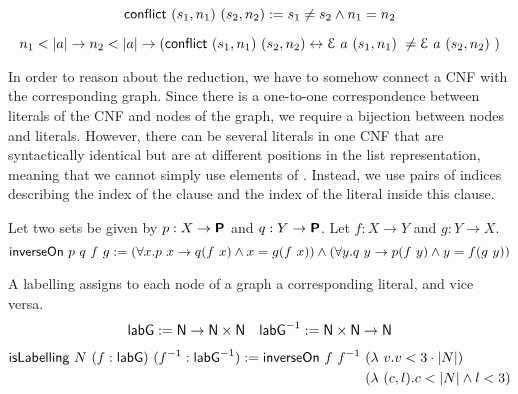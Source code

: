 \documentclass[a4paper,UKenglish,cleveref, autoref]{lipics-v2019}
\newcommand{\TODO}[1]{}
\begin{document}
\begin{definition}
  \[\normalfont\textsf{conflict}~(s_1, n_1)~(s_2, n_2) := s_1 \neq s_2 \land n_1 = n_2 \]
\end{definition}
\begin{proposition}\label{prop:conflictingassgn}
  \[n_1 < |a| \rightarrow n_2 < |a| \rightarrow (\normalfont\textsf{conflict}~(s_1, n_1)~(s_2, n_2) \leftrightarrow \mathcal{E}~a~(s_1, n_1)~ \neq \mathcal{E}~a~(s_2, n_2)~) \]
\end{proposition}

In order to reason about the reduction, we have to somehow connect a CNF with the corresponding graph. Since there is a one-to-one correspondence between literals of the CNF and nodes of the graph, we require a bijection between nodes and literals. However, there can be several literals in one CNF that are syntactically identical but are at different positions in the list representation, meaning that we cannot simply use elements of \literal. Instead, we use pairs of indices describing the index of the clause and the index of the literal inside this clause.

\begin{definition}
  Let two sets be given by $p : X \rightarrow \textsf{\bfseries P}$ and $q : Y \rightarrow \textsf{\bfseries P}$. Let $f : X \rightarrow Y$ and $g : Y \rightarrow X$.
  \[\normalfont\textsf{inverseOn}~p~q~f~g := (\forall x. p~x \rightarrow q(f~x) \land x = g(f~x)) \land (\forall y. q~y \rightarrow p(f~y) \land y = f(g~y)) \]
\end{definition}

\TODO{ maybe add technical statements regarding map + inverseOn}

\begin{definition}
  A labelling assigns to each node of a graph a corresponding literal, and vice versa.
  \begin{align*}
  \normalfont\textsf{labG} := \mathsf{N} \rightarrow \mathsf{N} \times \mathsf{N} && \normalfont\textsf{labG}^{-1} := \mathsf{N} \times \mathsf{N} \rightarrow \mathsf{N}
  \end{align*}
  \begin{align*}
  \normalfont\textsf{isLabelling}~N~(f : \normalfont\textsf{labG})~(f^{-1} : \normalfont\textsf{labG}^{-1}) := \normalfont\textsf{inverseOn}~f~f^{-1}~ &(\lambda~v. v < 3 \cdot |N|)\\
  ~&(\lambda~(c, l). c < |N| \land l < 3) 
\end{align*}
\end{definition}
\end{document}
